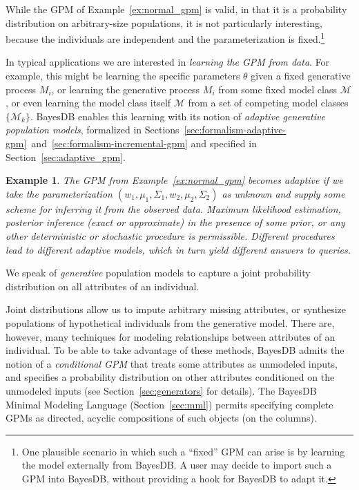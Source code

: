 \documentclass[10pt,letterpaper]{article}
\newtheorem{example}{Example}[section]
\newcommand{\set}[1]{\{#1\}}
\begin{document}
While the GPM of Example~\ref{ex:normal_gpm} is valid, in that it is a
probability distribution on arbitrary-size populations, it is not
particularly interesting, because the individuals are independent and
the parameterization is fixed.\footnote{One plausible scenario in
  which such a ``fixed'' GPM can arise is by learning the model
  externally from BayesDB.  A user may decide to import such a GPM
  into BayesDB, without providing a hook for BayesDB to adapt it.}

In typical applications we are interested in \textit{learning the GPM
  from data}. For example, this might be learning the specific
parameters $\theta$ given a fixed generative process $M_i$, or
learning the generative process $M_i$ from some fixed model class
$\mathcal{M}$, or even learning the model class itself $\mathcal{M}$
from a set of competing model classes $\set{\mathcal{M}_k}$.  BayesDB
enables this learning with its notion of \emph{adaptive generative population
  models}, formalized in
Sections~\ref{sec:formalism-adaptive-gpm}~and~\ref{sec:formalism-incremental-gpm}
and specified in Section~\ref{sec:adaptive_gpm}.

\begin{example}
The GPM from Example~\ref{ex:normal_gpm} becomes adaptive if we take
the parameterization $(w_1, \mu_1, \Sigma_1, w_2, \mu_2, \Sigma_2)$ as
unknown and supply some scheme for inferring it from the observed
data.  Maximum likelihood estimation, posterior inference (exact or
approximate) in the presence of some prior, or any other deterministic
or stochastic procedure is permissible.  Different procedures lead to
different adaptive models, which in turn yield different answers to
queries.
\end{example}

We speak of \emph{generative} population models to capture a
joint probability distribution on all attributes of an individual.


Joint distributions allow us to impute arbitrary missing attributes, or 
synthesize populations of hypothetical individuals from the generative 
model.  There are,
however, many techniques for modeling relationships between attributes
of an individual.  To be able to take advantage of these methods,
BayesDB admits the notion of a \emph{conditional GPM} that treats some
attributes as unmodeled inputs, and specifies a probability
distribution on other attributes conditioned on the unmodeled inputs
(see Section~\ref{sec:generators} for
details).  The BayesDB Minimal Modeling Language
(Section~\ref{sec:mml}) permits specifying complete GPMs as directed,
acyclic compositions of such objects (on the columns).
\end{document}
